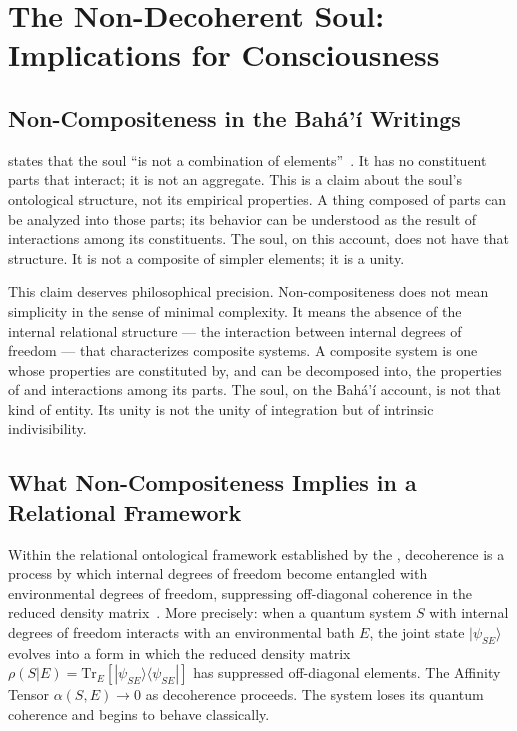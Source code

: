 
\section{The Non-Decoherent Soul: Implications for Consciousness}
\label{sec:soul}

\subsection{Non-Compositeness in the Bahá'í Writings}

\AbdulBaha states that the soul ``is not a combination of elements''~\citep{SAQ}.
It has no constituent parts that interact; it is not an aggregate.
This is a claim about the soul's ontological structure, not its empirical properties.
A thing composed of parts can be analyzed into those parts; its behavior
can be understood as the result of interactions among its constituents.
The soul, on this account, does not have that structure.
It is not a composite of simpler elements; it is a unity.

This claim deserves philosophical precision.
Non-compositeness does not mean simplicity in the sense of minimal complexity.
It means the absence of the internal relational structure --- the interaction
between internal degrees of freedom --- that characterizes composite systems.
A composite system is one whose properties are constituted by, and can be
decomposed into, the properties of and interactions among its parts.
The soul, on the Bahá'í account, is not that kind of entity.
Its unity is not the unity of integration but of intrinsic indivisibility.

\subsection{What Non-Compositeness Implies in a Relational Framework}

Within the relational ontological framework established by the \RCT,
decoherence is a process by which internal degrees of freedom become entangled
with environmental degrees of freedom, suppressing off-diagonal coherence
in the reduced density matrix~\citep{Zurek2003}.
More precisely: when a quantum system $S$ with internal degrees of freedom
interacts with an environmental bath $E$, the joint state $|\psi_{SE}\rangle$
evolves into a form in which the reduced density matrix $\rho(S|E) = \text{Tr}_E[|\psi_{SE}\rangle\langle\psi_{SE}|]$
has suppressed off-diagonal elements.
The Affinity Tensor $\alpha(S,E) \to 0$ as decoherence proceeds.
The system loses its quantum coherence and begins to behave classically.

